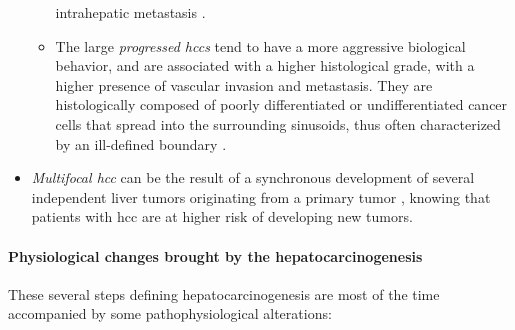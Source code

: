 \begin{itemize}
\begin{itemize}
    intrahepatic metastasis \cite{Park2011}.
  \item The large \emph{progressed \ac{hcc}s} tend to have a more aggressive
    biological behavior, and are associated with a higher histological
    grade, with a higher presence of vascular invasion and metastasis. They are histologically composed of poorly differentiated or
    undifferentiated cancer cells that spread into the surrounding
    sinusoids, thus often characterized by an ill-defined boundary \cite{Kudo2010,Beasley1981,ElSerag2011,Baffy2012,McGlynn2011,Tyson2011, Theise2006, Trevisani2008a}.
  \end{itemize}
\item \emph{Multifocal \ac{hcc}} can be the result of a synchronous development
  of several independent liver tumors originating from a primary tumor \cite{Trevisani2008a}, knowing that patients with
  \ac{hcc} are at higher risk of developing new tumors.
\end{itemize}

\paragraph{Physiological changes brought by the hepatocarcinogenesis}

These several steps defining hepatocarcinogenesis are most of the time
accompanied by some pathophysiological alterations:

